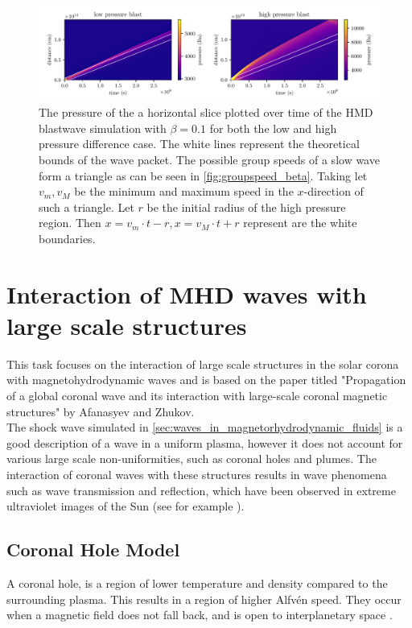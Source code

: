 \documentclass[a4paper]{article}
\numberwithin{figure}{section}
\numberwithin{equation}{section}
\begin{document}
\begin{figure}[h]
	\centering
	\includegraphics[width=1.1\textwidth]{figures/slowwave_time.pdf}
	\caption{The pressure of the a horizontal slice plotted over time of the HMD blastwave simulation with $\beta = 0.1$ for both the low and high pressure difference case. The white lines represent the theoretical bounds of the wave packet. The possible group speeds of a slow wave form a triangle as can be seen in \cref{fig:groupspeed_beta}. Taking let $v_m, v_M$ be the minimum and maximum speed in the $x$-direction of such a triangle. Let $r$ be the initial radius of the high pressure region. Then $x = v_m \cdot t - r, x = v_M \cdot t + r$ represent are the white boundaries.}
	\label{fig:slowwave_time}
\end{figure}
\pagebreak
\section{Interaction of MHD waves with large scale structures}
This task focuses on the interaction of large scale structures in the solar corona with magnetohydrodynamic waves and is based on the paper titled "Propagation of a global coronal wave and its interaction with large-scale coronal magnetic structures" by Afanasyev and Zhukov.  \cite{afanasyev2018propagation}\\

The shock wave simulated in \cref{sec:waves_in_magnetorhydrodynamic_fluids} is a good description of a wave in a uniform plasma, however it does not account for various large scale non-uniformities, such as coronal holes and plumes. The interaction of coronal waves with these structures results in wave phenomena such as wave transmission and reflection, which have been observed in extreme ultraviolet images of the Sun (see for example \cite{gopalswamy2009euv}).
\subsection{Coronal Hole Model}
A coronal hole, is a region of lower temperature and density compared to the surrounding plasma. This results in a region of higher Alfv\'en speed. They occur when a magnetic field does not fall back, and is open to interplanetary space .\\
\end{document}
